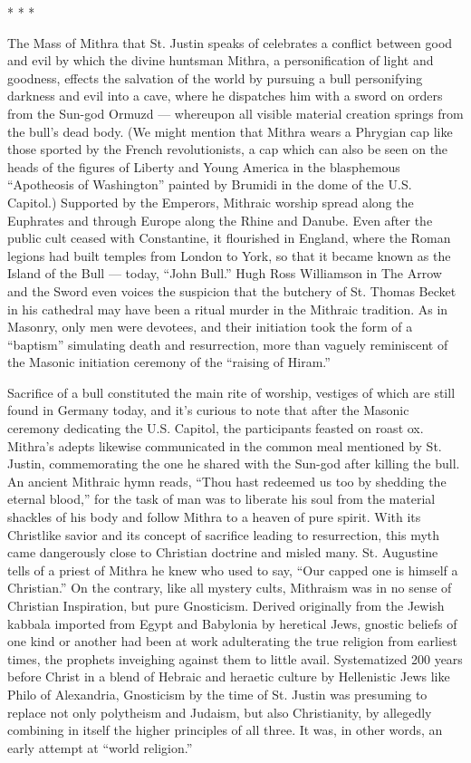 \begin{center}* * *\end{center}

The Mass of Mithra that St. Justin speaks of celebrates a conflict between good and evil by which the divine huntsman Mithra, a personification of light and goodness, effects the salvation of the world by pursuing a bull personifying darkness and evil into a cave, where he dispatches him with a sword on orders from the Sun-god Ormuzd --- whereupon all visible material creation springs from the bull's dead body. (We might mention that Mithra wears a Phrygian cap like those sported by the French revolutionists, a cap which can also be seen on the heads of the figures of Liberty and Young America in the blasphemous ``Apotheosis of Washington'' painted by Brumidi in the dome of the U.S. Capitol.) Supported by the Emperors, Mithraic worship spread along the Euphrates and through Europe along the Rhine and Danube. Even after the public cult ceased with Constantine, it flourished in England, where the Roman legions had built temples from London to York, so that it became known as the Island of the Bull --- today, ``John Bull.'' Hugh Ross Williamson in The Arrow and the Sword even voices the suspicion that the butchery of St. Thomas Becket in his cathedral may have been a ritual murder in the Mithraic tradition. As in Masonry, only men were devotees, and their initiation took the form of a ``baptism'' simulating death and resurrection, more than vaguely reminiscent of the Masonic initiation ceremony of the ``raising of Hiram.''

Sacrifice of a bull constituted the main rite of worship, vestiges of which are still found in Germany today, and it's curious to note that after the Masonic ceremony dedicating the U.S. Capitol, the participants feasted on roast ox. Mithra's adepts likewise communicated in the common meal mentioned by St. Justin, commemorating the one he shared with the Sun-god after killing the bull. An ancient Mithraic hymn reads, ``Thou hast redeemed us too by shedding the eternal blood,'' for the task of man was to liberate his soul from the material shackles of his body and follow Mithra to a heaven of pure spirit. With its Christlike savior and its concept of sacrifice leading to resurrection, this myth came dangerously close to Christian doctrine and misled many. St. Augustine tells of a priest of Mithra he knew who used to say, ``Our capped one is himself a Christian.'' On the contrary, like all mystery cults, Mithraism was in no sense of Christian Inspiration, but pure Gnosticism. Derived originally from the Jewish kabbala imported from Egypt and Babylonia by heretical Jews, gnostic beliefs of one kind or another had been at work adulterating the true religion from earliest times, the prophets inveighing against them to little avail. Systematized 200 years before Christ in a blend of Hebraic and heraetic culture by Hellenistic Jews like Philo of Alexandria, Gnosticism by the time of St. Justin was presuming to replace not only polytheism and Judaism, but also Christianity, by allegedly combining in itself the higher principles of all three. It was, in other words, an early attempt at ``world religion.''


